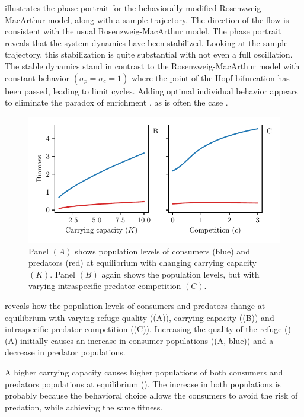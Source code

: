  illustrates the phase portrait for the behaviorally modified Rosenzweig-MacArthur model, along with a sample trajectory. The direction of the flow is consistent with the usual Rosenzweig-MacArthur model. The phase portrait reveals that the system dynamics have been stabilized. Looking at the sample trajectory, this stabilization is quite substantial with not even a full oscillation. The stable dynamics stand in contrast to the Rosenzweig-MacArthur model with constant behavior $(\sigma_p=\sigma_c=1)$ where the point of the Hopf bifurcation has been passed, leading to limit cycles. Adding optimal individual behavior appears to eliminate the paradox of enrichment \citep{rosenzweig1971paradox}, as is often the case \citep{abrams2010implications}.
\begin{figure}[H]
  \caption{Panel $(A)$ shows population levels of consumers (blue) and predators (red) at equilibrium with changing carrying capacity $(K)$. Panel $(B)$ again shows the population levels, but with varying intraspecific predator competition $(C)$.}
  \label{fig:pop_levels}
  \includegraphics{plots/pop_levels_c.pdf}
\end{figure}
 reveals how the population levels of consumers and predators change at equilibrium with varying refuge quality ((A)), carrying capacity ((B)) and intraspecific predator competition ((C)).
Increasing the quality of the refuge ()(A) initially causes an increase in consumer populations ((A, blue)) and a decrease in predator populations.

A higher carrying capacity causes higher populations of both consumers and predators populations at equilibrium (). The increase in both populations is probably because the behavioral choice allows the consumers to avoid the risk of predation, while achieving the same fitness.

